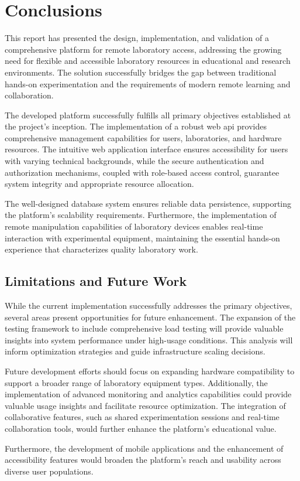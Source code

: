 \chapter{Conclusions}
\label{cap:conclusions}

This report has presented the design, implementation, and validation of a comprehensive platform for remote laboratory access, addressing the growing need for flexible and accessible laboratory resources in educational and research environments. The solution successfully bridges the gap between traditional hands-on experimentation and the requirements of modern remote learning and collaboration.

The developed platform successfully fulfills all primary objectives established at the project's inception. The implementation of a robust web \ac{api} provides comprehensive management capabilities for users, laboratories, and hardware resources. The intuitive web application interface ensures accessibility for users with varying technical backgrounds, while the secure authentication and authorization mechanisms, coupled with role-based access control, guarantee system integrity and appropriate resource allocation.

The well-designed database system ensures reliable data persistence, supporting the platform's scalability requirements. Furthermore, the implementation of remote manipulation capabilities of laboratory devices enables real-time interaction with experimental equipment, maintaining the essential hands-on experience that characterizes quality laboratory work.

\section{Limitations and Future Work}
\label{sec:limitations_future_work}

While the current implementation successfully addresses the primary objectives, several areas present opportunities for future enhancement. The expansion of the testing framework to include comprehensive load testing will provide valuable insights into system performance under high-usage conditions. This analysis will inform optimization strategies and guide infrastructure scaling decisions.

Future development efforts should focus on expanding hardware compatibility to support a broader range of laboratory equipment types. Additionally, the implementation of advanced monitoring and analytics capabilities could provide valuable usage insights and facilitate resource optimization. The integration of collaborative features, such as shared experimentation sessions and real-time collaboration tools, would further enhance the platform's educational value.

Furthermore, the development of mobile applications and the enhancement of accessibility features would broaden the platform's reach and usability across diverse user populations.